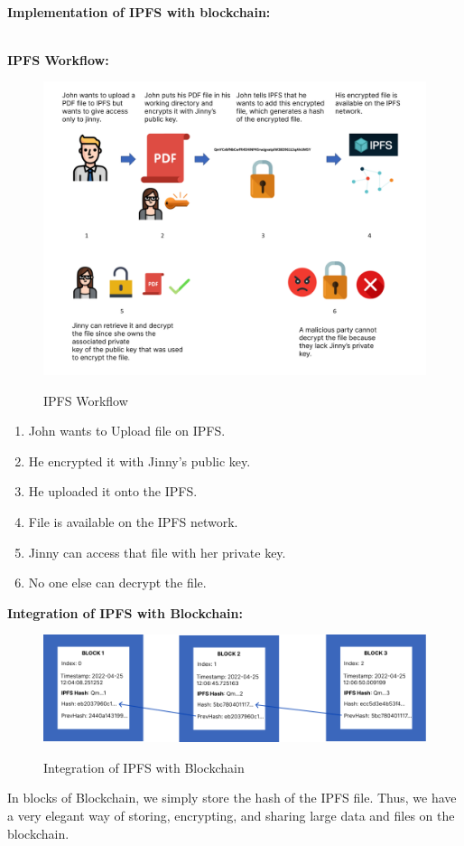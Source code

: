 \noindent
\\
\textbf{Implementation of IPFS with blockchain:}

\noindent
\\
\textbf{IPFS Workflow:}
\begin{figure}[h]
    \centering
    \includegraphics[scale=0.45]{images/ipfs_workflow.png}\\[0.5cm]
    \caption{IPFS Workflow}
    \label{fig:ipfs_workflow}
\end{figure}

\begin{enumerate}
    \item John wants to Upload file on IPFS.
    \item He encrypted it with Jinny's public key.
    \item He uploaded it onto the IPFS.
    \item File is available on the IPFS network.
    \item Jinny can access that file with her private key.
    \item No one else can decrypt the file.
\end{enumerate}

\noindent
\textbf{Integration of IPFS with Blockchain:}
\begin{figure}[!h]
    \centering
    \includegraphics[scale=0.4]{images/ipfs_blockchain.png}\\[0.5cm]
    \caption{Integration of IPFS with Blockchain}
    \label{fig:ipfs_workflow}
\end{figure}

\noindent
In blocks of Blockchain, we simply store the hash of the IPFS file. Thus, we have a very elegant way of storing, encrypting, and sharing large data and files on the blockchain.
